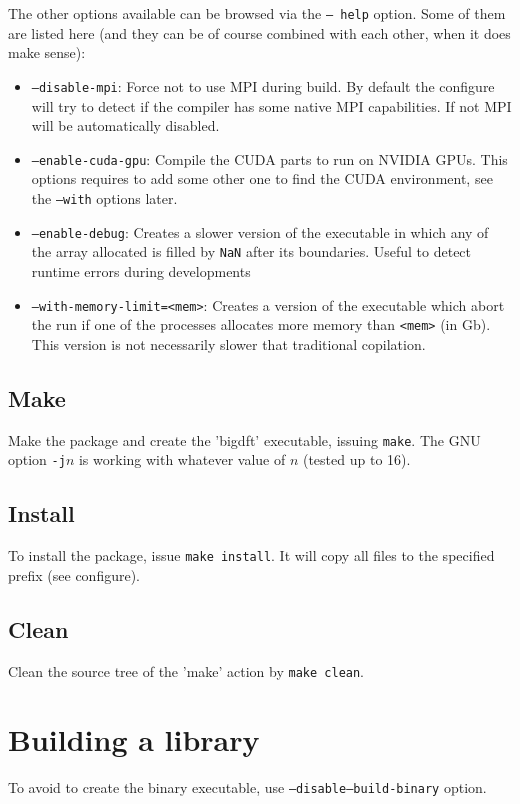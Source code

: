 \documentclass[a4paper,11pt]{report}
\begin{document}
The other options available can be browsed via the \texttt{-- help} option.
Some of them are listed here (and they can be of course combined with each other, when it does make sense):
\begin{itemize}
  \item \texttt{--disable-mpi}: Force not to use MPI during build. By default the configure will try to detect if the compiler has some native MPI capabilities. If not MPI will be automatically disabled.
  \item \texttt{--enable-cuda-gpu}: Compile the CUDA parts to run on NVIDIA GPUs. This options requires to add some other one to find the CUDA environment, see the \texttt{--with} options later.
\item \texttt{--enable-debug}: Creates a slower version of the executable in which any of the array allocated is filled by \texttt{NaN} after its boundaries. Useful to detect runtime errors during developments
\item \texttt{--with-memory-limit=<mem>}: Creates a version of the executable which abort the run if one of the processes allocates more memory than \texttt{<mem>} (in Gb). This version is not necessarily slower that traditional copilation.
\end{itemize}


\subsection{Make}
Make the package and create the 'bigdft' executable, issuing \texttt{make}. The GNU option \texttt{-j$n$} is working with whatever value of $n$ (tested up to 16).

\subsection{Install}
To install the package, issue \texttt{make install}. It will copy all files to the specified prefix (see configure).

\subsection{Clean}
Clean the source tree of the 'make' action by \texttt{make clean}.

\section{Building a library}
To avoid to create the binary executable,
use \texttt{--disable--build-binary} option.
\end{document}
